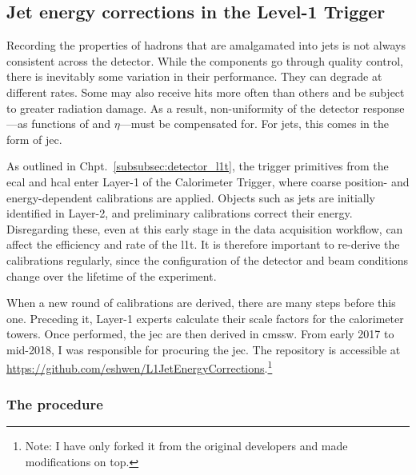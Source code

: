 

\subsection{Jet energy corrections in the Level-1 Trigger}
\label{subsec:detector_jecs}

Recording the properties of hadrons that are amalgamated into \glspl{jet} is not always consistent across the detector. While the components go through quality control, there is inevitably some variation in their performance. They can degrade at different rates. Some may also receive hits more often than others and be subject to greater radiation damage. As a result, non-uniformity of the detector response---as functions of \pt and $\eta$---must be compensated for. For \glspl{jet}, this comes in the form of \gls{jec}.

As outlined in Chpt.~\ref{subsubsec:detector_l1t}, the trigger primitives from the \acrshort{ecal} and \acrshort{hcal} enter Layer-1 of the Calorimeter Trigger, where coarse position- and energy-dependent calibrations are applied. Objects such as \glspl{jet} are initially identified in Layer-2, and preliminary calibrations correct their energy. Disregarding these, even at this early stage in the data acquisition workflow, can affect the efficiency and rate of the \acrlong{l1t}. It is therefore important to re-derive the calibrations regularly, since the configuration of the detector and beam conditions change over the lifetime of the experiment.

When a new round of calibrations are derived, there are many steps before this one. Preceding it, Layer-1 experts calculate their scale factors for the calorimeter towers. Once performed, the \acrlong{jec} are then derived in \acrshort{cmssw}. From early 2017 to mid-2018, I was responsible for procuring the \acrshort{jec}. The repository is accessible at \url{https://github.com/eshwen/L1JetEnergyCorrections}.\footnote{Note: I have only forked it from the original developers and made modifications on top.}




\subsubsection{The procedure}
\label{subsubsec:detector_jec_procedure}


